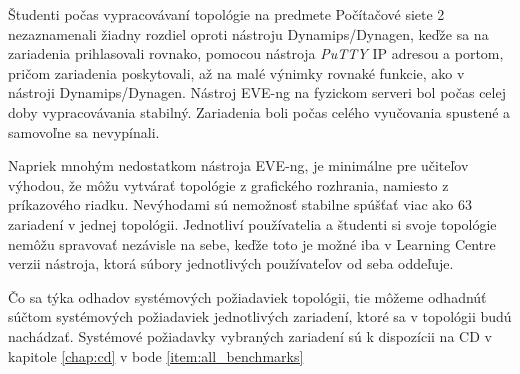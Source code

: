 Študenti počas vypracovávaní topológie na predmete Počítačové siete 2 nezaznamenali žiadny rozdiel oproti nástroju Dynamips/Dynagen, keďže sa na zariadenia prihlasovali rovnako, pomocou nástroja \emph{PuTTY} IP adresou a portom, pričom zariadenia poskytovali, až na malé výnimky rovnaké funkcie, ako v nástroji Dynamips/Dynagen. Nástroj EVE-ng na fyzickom serveri bol počas celej doby vypracovávania stabilný. Zariadenia boli počas celého vyučovania spustené a samovoľne sa nevypínali.

Napriek mnohým nedostatkom nástroja EVE-ng, je minimálne pre učiteľov výhodou, že môžu vytvárať topológie z grafického rozhrania, namiesto z príkazového riadku. Nevýhodami sú nemožnosť stabilne spúšťať viac ako 63 zariadení v jednej topológii. Jednotliví používatelia a študenti si svoje topológie nemôžu spravovať nezávisle na sebe, keďže toto je možné iba v Learning Centre verzii nástroja, ktorá súbory jednotlivých používateľov od seba oddeľuje.

Čo sa týka odhadov systémových požiadaviek topológii, tie môžeme odhadnúť súčtom systémových požiadaviek jednotlivých zariadení, ktoré sa v topológii budú nachádzať. Systémové požiadavky vybraných zariadení sú k dispozícii na CD v kapitole \ref{chap:cd} v bode \ref{item:all_benchmarks}